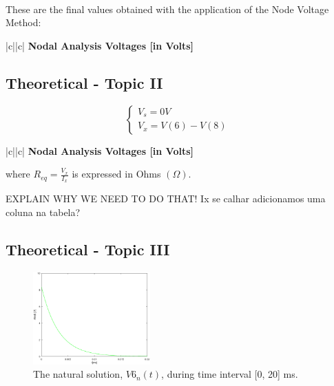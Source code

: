 \paragraph{}
These are the final values obtained with the application of the Node Voltage Method:

\begin{center}
   \begin{tabular}{|c||c|}
      \hline    
       {\bf Nodal Analysis Voltages [in Volts]} \\
      \hline
        
   \end{tabular}
 \end{center}


\subsection{Theoretical - Topic II}
\label{subsec:second_topic}

\[
\left\{\begin{matrix}
V_s=0V\\
V_x=V(6)-V(8)\
\end{matrix}\right.
\]

\begin{center}
   \begin{tabular}{|c||c|}
      \hline    
       {\bf Nodal Analysis Voltages [in Volts]} \\
      \hline
        
   \end{tabular}
 \end{center}
 
 where $ R_{eq} = \frac{V_x}{I_x} $ is expressed in Ohms $(\Omega)$.
 
 EXPLAIN WHY WE NEED TO DO THAT!
 Ix se calhar adicionamos uma coluna na tabela?
 
\subsection{Theoretical - Topic III}
\label{subsec:third_topic}

\begin{figure}[H] \centering
\includegraphics[width=0.4\textwidth]{natural.eps}
\caption{The natural solution, $V6_n(t)$, during time interval [0, 20] ms.}
\label{fig:theo_third}
\end{figure}

